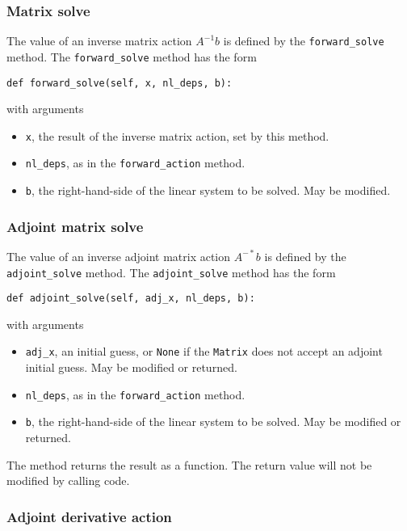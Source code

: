 \documentclass[11pt]{article}
\begin{document}
\subsubsection{Matrix solve}

The value of an inverse matrix action $A^{-1} b$ is defined by the
\texttt{forward\_solve} method. The \texttt{forward\_solve} method has the
form
\begin{lstlisting}
def forward_solve(self, x, nl_deps, b):
\end{lstlisting}
with arguments
\begin{itemize}
  \item \texttt{x}, the result of the inverse matrix action, set by this
    method.
  \item \texttt{nl\_deps}, as in the \texttt{forward\_action} method.
  \item \texttt{b}, the right-hand-side of the linear system to be solved. May
    be modified.
\end{itemize}

\subsubsection{Adjoint matrix solve}

The value of an inverse adjoint matrix action $A^{-*} b$ is defined by the
\texttt{adjoint\_solve} method. The \texttt{adjoint\_solve} method has the
form
\begin{lstlisting}
def adjoint_solve(self, adj_x, nl_deps, b):
\end{lstlisting}
with arguments
\begin{itemize}
  \item \texttt{adj\_x}, an initial guess, or \texttt{None} if the
    \texttt{Matrix} does not accept an adjoint initial guess. May be modified
    or returned.
  \item \texttt{nl\_deps}, as in the \texttt{forward\_action} method.
  \item \texttt{b}, the right-hand-side of the linear system to be solved. May
    be modified or returned.
\end{itemize}
The method returns the result as a function. The return value will not be
modified by calling code.

\subsubsection{Adjoint derivative action}
\end{document}
